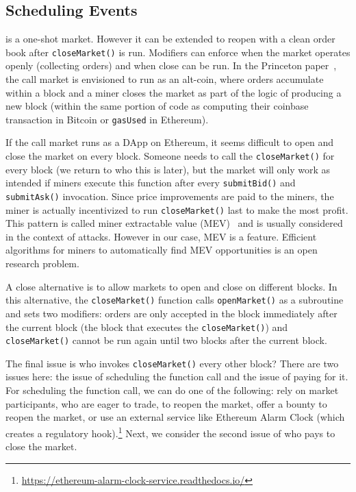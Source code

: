 
\subsection{Scheduling Events}

\cm is a one-shot market. However it can be extended to reopen with a clean order book after \texttt{closeMarket()} is run. Modifiers can enforce when the market operates openly (collecting orders) and when close can be run. In the Princeton paper~\cite{clark2014decentralizing}, the call market is envisioned to run as an alt-coin, where orders accumulate within a block and a miner closes the market as part of the logic of producing a new block (\ie within the same portion of code as computing their coinbase transaction in Bitcoin or \texttt{gasUsed} in Ethereum).

If the call market runs as a DApp on Ethereum, it seems difficult to open and close the market on every block. Someone needs to call the \texttt{closeMarket()} for every block (we return to who this is later), but the market will only work as intended if miners execute this function after every \texttt{submitBid()} and \texttt{submitAsk()} invocation. Since price improvements are paid to the miners, the miner is actually incentivized to run \texttt{closeMarket()} last to make the most profit. This pattern is called miner extractable value (MEV)~\cite{daian2019flash} and is usually considered in the context of attacks. However in our case, MEV is a feature. Efficient algorithms for miners to automatically find MEV opportunities is an open research problem.


A close alternative is to allow markets to open and close on different blocks. In this alternative, the \texttt{closeMarket()} function calls \texttt{openMarket()} as a subroutine and sets two modifiers: orders are only accepted in the block immediately after the current block (\ie the block that executes the \texttt{closeMarket()}) and \texttt{closeMarket()} cannot be run again until two blocks after the current block.

The final issue is who invokes \texttt{closeMarket()} every other block? There are two issues here: the issue of scheduling the function call and the issue of paying for it. For scheduling the function call, we can do one of the following: rely on market participants, who are eager to trade, to reopen the market, offer a bounty to reopen the market, or use an external service like Ethereum Alarm Clock (which creates a regulatory hook).\footnote{\url{https://ethereum-alarm-clock-service.readthedocs.io/}} Next, we consider the second issue of who pays to close the market.

